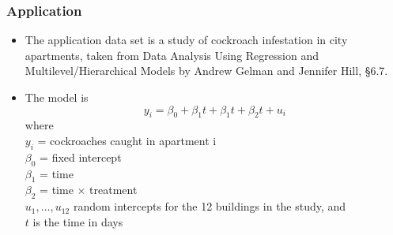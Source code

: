 \documentclass{beamer}
\begin{document}
	\begin{frame}
		\frametitle{Application}
		\begin{itemize}
			\item The application data set is a study of cockroach infestation in city apartments, taken from
			      Data Analysis Using Regression and Multilevel/Hierarchical Models by Andrew Gelman and Jennifer
			      Hill, \S 6.7.
			\item The model is $$y_i = \beta_0 + \beta_1 t + \beta_1 t + \beta_2 t + u_i$$ where\\
			      $y_i$ = cockroaches caught in apartment i \\
			      $\beta_0$ = fixed intercept \\
			      $\beta_1$ = time \\
			      $\beta_2$ = time $\times$ treatment \\
			      $u_1, \ldots, u_{12}$ random intercepts for the 12 buildings in the study, and \\
			      $t$ is the time in days\\
		\end{itemize}
	\end{frame}
	
\end{document}
